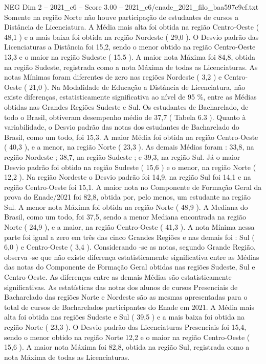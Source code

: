 \begin{textsample}{NEG Dim 2 – 2021\_c6 – Score 3.00 – 2021\_c6/enade\_2021\_filo\_baa597e9cf.txt}
Somente na região Norte não houve participação de estudantes de cursos a Distância de Licenciatura.
A Média mais alta foi obtida na região Centro-Oeste ( 48,1 ) e a mais baixa foi obtida na região Nordeste ( 29,0 ).
O Desvio padrão das Licenciaturas a Distância foi 15,2, sendo o menor obtido na região Centro-Oeste 13,3 e o maior na região Sudeste ( 15,5 ).
A maior nota Máxima foi 84,8, obtida na região Sudeste, registrada como a nota Máxima de todas as Licenciaturas.
As notas Mínimas foram diferentes de zero nas regiões Nordeste ( 3,2 ) e Centro-Oeste ( 21,0 ).
Na Modalidade de Educação a Distância de Licenciatura, não existe diferenças, estatisticamente significativa ao nível de 95 \%, entre as Médias obtidas nas Grandes Regiões Sudeste e Sul.
Os estudantes de Bacharelado, de todo o Brasil, obtiveram desempenho médio de 37,7 ( Tabela 6.3 ).
Quanto à variabilidade, o Desvio padrão das notas dos estudantes de Bacharelado do Brasil, como um todo, foi 15,3.
A maior Média foi obtida na região Centro-Oeste ( 40,3 ), e a menor, na região Norte ( 23,3 ).
As demais Médias foram : 33,8, na região Nordeste ; 38,7, na região Sudeste ; e 39,3, na região Sul.
Já o maior Desvio padrão foi obtido na região Sudeste ( 15,6 ) e o menor, na região Norte ( 12,2 ).
Na região Nordeste o Desvio padrão foi 14,9, na região Sul foi 14,1 e na região Centro-Oeste foi 15,1.
A maior nota no Componente de Formação Geral da prova do Enade/2021 foi 82,8, obtida por, pelo menos, um estudante na região Sul.
A menor nota Máxima foi obtida na região Norte ( 48,9 ).
A Mediana do Brasil, como um todo, foi 37,5, sendo a menor Mediana encontrada na região Norte ( 24,9 ), e a maior, na região Centro-Oeste ( 41,3 ).
A nota Mínima nessa parte foi igual a zero em três das cinco Grandes Regiões e nas demais foi : Sul ( 6,0 ) e Centro-Oeste ( 3,4 ).
Considerando -se as notas, segundo Grande Região, observa -se que não existe diferença estatisticamente significativa entre as Médias das notas do Componente de Formação Geral obtidas nas regiões Sudeste, Sul e Centro-Oeste.
As diferenças entre as demais Médias são estatisticamente significativas.
As estatísticas das notas dos alunos de cursos Presenciais de Bacharelado das regiões Norte e Nordeste são as mesmas apresentadas para o total de cursos de Bacharelados participantes do Enade em 2021.
A Média mais alta foi obtida nas regiões Sudeste e Sul ( 39,5 ) e a mais baixa foi obtida na região Norte ( 23,3 ).
O Desvio padrão das Licenciaturas Presenciais foi 15,4, sendo o menor obtido na região Norte 12,2 e o maior na região Centro-Oeste ( 15,6 ).
A maior nota Máxima foi 82,8, obtida na região Sul, registrada como a nota Máxima de todas as Licenciaturas.

\end{textsample}

